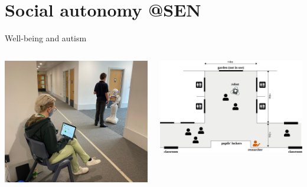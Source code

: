 \documentclass[xcolor=table]{beamer}
\begin{document}
\section*{Social autonomy @SEN}

\begin{frame}{Well-being and autism}
    \begin{columns}
        \begin{column}{0.5\linewidth}
            \begin{center}
                \includegraphics[width=\linewidth]{figs/robots4sen/location.jpg}
            \end{center}
        \end{column}
        \begin{column}{0.5\linewidth}
            \begin{center}
                \includegraphics[width=\linewidth]{figs/robots4sen/setup}
            \end{center}
        \end{column}
    \end{columns}
\end{frame}
\end{document}
